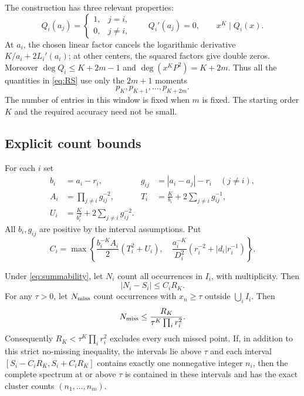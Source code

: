 The construction has three relevant properties:
\[
 Q_i(a_j)=\begin{cases}1,&j=i,\\0,&j\ne i,\end{cases}
 \qquad Q_i'(a_j)=0,
 \qquad x^K\mid Q_i(x).
\]
At $a_i$, the chosen linear factor cancels the logarithmic derivative
$K/a_i+2L_i'(a_i)$; at other centers, the squared factors give double zeros.
Moreover $\deg Q_i\le K+2m-1$ and $\deg(x^KP^2)=K+2m$. Thus all the
quantities in \eqref{eq:RS} use only the $2m+1$ moments
\begin{equation}\label{eq:window}
 p_K,p_{K+1},\ldots,p_{K+2m}.
\end{equation}
The number of entries in this window is fixed when $m$ is fixed. The starting
order $K$ and the required accuracy need not be small.

\subsection{Explicit count bounds}

For each $i$ set
\begin{align}
 b_i&=a_i-r_i,&g_{ij}&=|a_i-a_j|-r_i\quad(j\ne i),\\
 A_i&=\prod_{j\ne i}g_{ij}^{-2},
 &T_i&=\frac K{b_i}+2\sum_{j\ne i}g_{ij}^{-1},\\
 U_i&=\frac K{b_i^2}+2\sum_{j\ne i}g_{ij}^{-2}.&&
\end{align}
All $b_i,g_{ij}$ are positive by the interval assumptions. Put
\begin{equation}\label{eq:Ci}
 C_i=\max\left\{
 \frac{b_i^{-K}A_i}{2}(T_i^2+U_i),\quad
 \frac{a_i^{-K}}{D_i^2}\left(r_i^{-2}+|d_i|r_i^{-1}\right)
 \right\}.
\end{equation}

\begin{theorem}\label{thm:residual}
Under \eqref{eq:summability}, let $N_i$ count all occurrences in $I_i$,
with multiplicity. Then
\begin{equation}\label{eq:countbound}
 |N_i-S_i|\le C_iR_K.
\end{equation}
For any $\tau>0$, let $N_{\rm miss}$ count occurrences with $x_n\ge\tau$
outside $\bigcup_i I_i$. Then
\begin{equation}\label{eq:missing}
 N_{\rm miss}\le\frac{R_K}{\tau^K\prod_i r_i^2}.
\end{equation}
Consequently $R_K<\tau^K\prod_i r_i^2$ excludes every such missed point.
If, in addition to this strict no-missing inequality, the intervals lie
above $\tau$ and each interval
$[S_i-C_iR_K,S_i+C_iR_K]$ contains exactly one nonnegative integer $n_i$,
then the complete spectrum at or above $\tau$ is contained in these intervals
and has the exact cluster counts $(n_1,\ldots,n_m)$.
\end{theorem}

